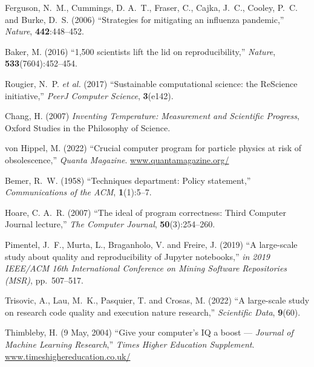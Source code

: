 \documentclass{comjnl}
\begin{document}
{\begin{thebibliography}{100}
Ferguson, N.~M., Cummings, D. A.~T., Fraser, C., Cajka, J.~C., Cooley, P.~C.
  and Burke, D.~S. (2006) ``Strategies for mitigating an influenza pandemic,''
  {\em Nature}, \textbf{442}:448--452.
\newblock {}

Baker, M. (2016) ``1,500 scientists lift the lid on reproducibility,'' {\em
  Nature}, \textbf{533}(7604):452--454.
\newblock {}

Rougier, N.~P. \emph{et al.} (2017) ``Sustainable computational science: the
  {ReScience} initiative,'' {\em PeerJ Computer Science}, \textbf{3}(e142).
\newblock {}

Chang, H. (2007) {\em Inventing Temperature: Measurement and Scientific
  Progress}, Oxford Studies in the Philosophy of Science.

von Hippel, M. (2022) ``Crucial computer program for particle physics at risk
  of obsolescence,'' {\em Quanta Magazine}.
\newblock
  \url{www.quantamagazine.org/}

Bemer, R.~W. (1958) ``Techniques department: Policy statement,'' {\em
  Communications of the ACM}, \textbf{1}(1):5--7.

Hoare, C. A.~R. (2007) ``The ideal of program correctness: {Third} {Computer}
  {Journal} lecture,'' {\em The Computer Journal}, \textbf{50}(3):254--260.
\newblock {}

Pimentel, J.~F., Murta, L., Braganholo, V. and Freire, J. (2019) ``A
  large-scale study about quality and reproducibility of {Jupyter} notebooks,''
  {\em in 2019 IEEE/ACM 16th International Conference on Mining Software
  Repositories {(MSR)}}, pp.~507--517.
\newblock {}

Trisovic, A., Lau, M.~K., Pasquier, T. and Crosas, M. (2022) ``A large-scale
  study on research code quality and execution nature research,'' {\em
  Scientific Data}, \textbf{9}(60).
\newblock {}

Thimbleby, H. (9 May, 2004) ``Give your computer's {IQ} a boost ---
  {{\emph{{Journal of Machine Learning Research}}}},'' {\em Times Higher
  Education Supplement}.
\newblock
  \url{www.timeshighereducation.co.uk/}


\end{thebibliography}}
\end{document}
